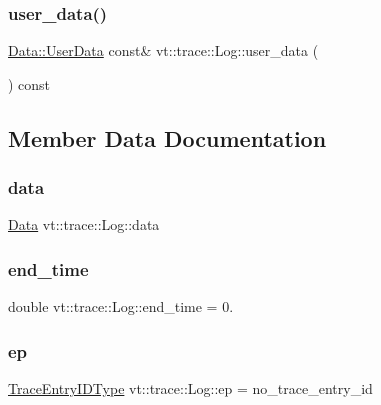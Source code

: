\subsubsection{\texorpdfstring{user\+\_\+data()}{user\_data()}}
{\footnotesize\ttfamily \hyperlink{structvt_1_1trace_1_1_log_1_1_data_1_1_user_data}{Data\+::\+User\+Data} const\& vt\+::trace\+::\+Log\+::user\+\_\+data (\begin{DoxyParamCaption}{ }\end{DoxyParamCaption}) const\hspace{0.3cm}{\ttfamily [inline]}}



\subsection{Member Data Documentation}
\mbox{\label{structvt_1_1trace_1_1_log_ac79b001b6167a37e337bc9d704af8535}} 
\subsubsection{\texorpdfstring{data}{data}}
{\footnotesize\ttfamily \hyperlink{unionvt_1_1trace_1_1_log_1_1_data}{Data} vt\+::trace\+::\+Log\+::data\hspace{0.3cm}{\ttfamily [private]}}

\mbox{\label{structvt_1_1trace_1_1_log_a86325bb2e6116b587f168bc2f1701f3a}} 
\subsubsection{\texorpdfstring{end\+\_\+time}{end\_time}}
{\footnotesize\ttfamily double vt\+::trace\+::\+Log\+::end\+\_\+time = 0.}

\mbox{\label{structvt_1_1trace_1_1_log_aaeb605b768747d37e7b4bb062f14bb32}} 
\subsubsection{\texorpdfstring{ep}{ep}}
{\footnotesize\ttfamily \hyperlink{namespacevt_1_1trace_a3c14050715ba9eceaeff51fb3de64f2f}{Trace\+Entry\+I\+D\+Type} vt\+::trace\+::\+Log\+::ep = no\+\_\+trace\+\_\+entry\+\_\+id}

